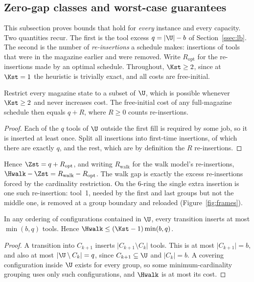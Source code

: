 \subsection{Zero-gap classes and worst-case guarantees}\label{ssec:ratio}

This subsection proves bounds that hold for \emph{every} instance and every capacity.
Two quantities recur. The first is the tool excess $q=\lvert\U\rvert-b$ of
Section~\ref{ssec:lb}. The second is the number of \emph{re-insertions} a schedule
makes: insertions of tools that were in the magazine earlier and were removed. Write
$R_{\mathrm{opt}}$ for the re-insertions made by an optimal schedule. Throughout,
$\Kst\ge2$, since at $\Kst=1$ the heuristic is trivially exact, and all costs are
free-initial.

\begin{lemma}\label{lem:costid}
Restrict every magazine state to a subset of $\U$, which is possible whenever
$\Kst\ge2$ and never increases cost. The free-initial cost of any full-magazine
schedule then equals $q+R$, where $R\ge0$ counts re-insertions.
\end{lemma}

\begin{proof}
Each of the $q$ tools of $\U$ outside the first fill is required by some job, so it
is inserted at least once. Split all insertions into first-time insertions, of which
there are exactly $q$, and the rest, which are by definition the $R$ re-insertions.
\end{proof}

Hence $\Zst=q+R_{\mathrm{opt}}$, and writing $R_{\mathrm{walk}}$ for the walk model's
re-insertions, $\Hwalk-\Zst=R_{\mathrm{walk}}-R_{\mathrm{opt}}$. The walk gap is
exactly the excess re-insertions forced by the cardinality restriction. On the
$6$-ring the single extra insertion is one such re-insertion: tool~1, needed by the
first and last groups but not the middle one, is removed at a group boundary and
reloaded (Figure~\ref{fig:frames}).

\begin{lemma}\label{lem:transcap}
In any ordering of configurations contained in $\U$, every transition inserts at most
$\min(b,q)$ tools. Hence $\Hwalk\le(\Kst-1)\min(b,q)$.
\end{lemma}

\begin{proof}
A transition into $C_{k+1}$ inserts $\lvert C_{k+1}\setminus C_k\rvert$ tools. This
is at most $\lvert C_{k+1}\rvert=b$, and also at most
$\lvert\U\setminus C_k\rvert=q$, since $C_{k+1}\subseteq\U$ and
$\lvert C_k\rvert=b$. A covering configuration inside $\U$ exists for every group, so
some minimum-cardinality grouping uses only such configurations, and $\Hwalk$ is at
most its cost.
\end{proof}

